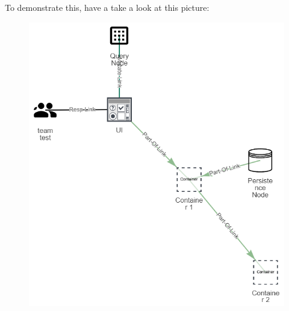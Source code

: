 \begin{itemize}
To demonstrate this, have a take a look at this picture:
\begin{figure}[H]
\centering
\includegraphics[scale=.55]{Bilder/CollapseExBefore.png}
\end{figure}


\end{itemize}
